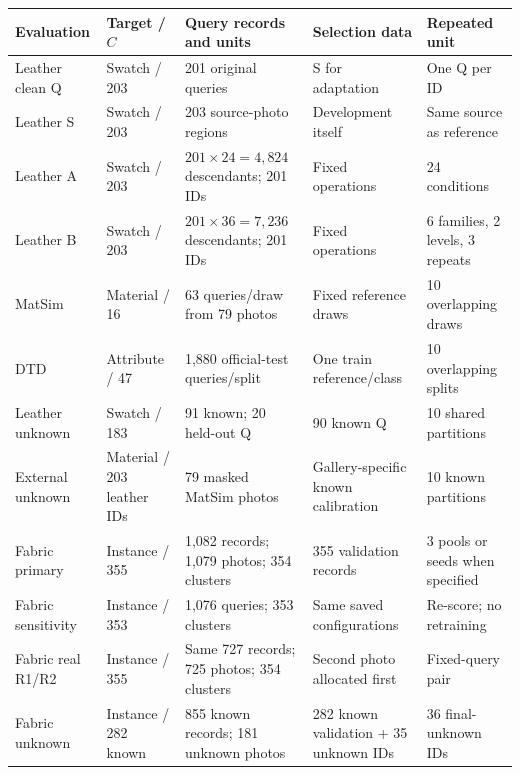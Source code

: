 \begin{tabularx}{\linewidth}{@{}P{.17\linewidth}P{.16\linewidth}P{.27\linewidth}P{.16\linewidth}X@{}}
\toprule
Evaluation & Target / $C$ & Query records and units & Selection data & Repeated unit \\
\midrule
Leather clean Q & Swatch / 203 & 201 original queries & S for adaptation & One Q per ID \\
Leather S & Swatch / 203 & 203 source-photo regions & Development itself & Same source as reference \\
Leather A & Swatch / 203 & $201\times24=4,824$ descendants; 201 IDs & Fixed operations & 24 conditions \\
Leather B & Swatch / 203 & $201\times36=7,236$ descendants; 201 IDs & Fixed operations & 6 families, 2 levels, 3 repeats \\
MatSim & Material / 16 & 63 queries/draw from 79 photos & Fixed reference draws & 10 overlapping draws \\
DTD & Attribute / 47 & 1,880 official-test queries/split & One train reference/class & 10 overlapping splits \\
Leather unknown & Swatch / 183 & 91 known; 20 held-out Q & 90 known Q & 10 shared partitions \\
External unknown & Material / 203 leather IDs & 79 masked MatSim photos & Gallery-specific known calibration & 10 known partitions \\
\midrule
Fabric primary & Instance / 355 & 1,082 records; 1,079 photos; 354 clusters & 355 validation records & 3 pools or seeds when specified \\
Fabric sensitivity & Instance / 353 & 1,076 queries; 353 clusters & Same saved configurations & Re-score; no retraining \\
Fabric real R1/R2 & Instance / 355 & Same 727 records; 725 photos; 354 clusters & Second photo allocated first & Fixed-query pair \\
Fabric unknown & Instance / 282 known & 855 known records; 181 unknown photos & 282 known validation + 35 unknown IDs & 36 final-unknown IDs \\
\bottomrule
\end{tabularx}
